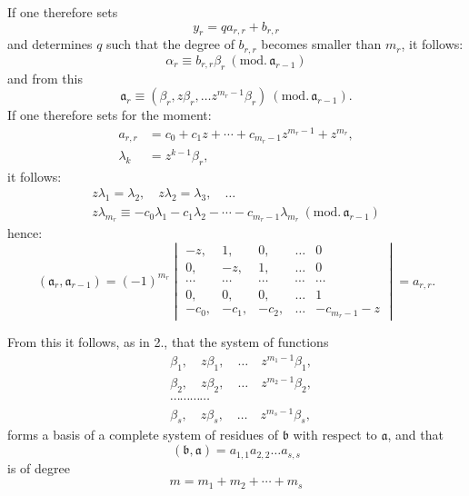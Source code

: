 \documentclass{article}
\begin{document}
If one therefore sets
\[ y_{r} = qa_{r,r} + b_{r,r} \]
and determines $q$ such that the degree of $b_{r,r}$ becomes smaller than $m_{r}$, it follows:
\[ \alpha_{r} \equiv b_{r,r}\beta_{r} \ (\text{mod.}\,\mathfrak{a}_{r-1}) \]
and from this
\[ \mathfrak{a}_{r} \equiv (\beta_{r}, z\beta_{r}, \ldots z^{m_{r}-1}\beta_{r}) \ (\text{mod.}\,\mathfrak{a}_{r-1}). \]
If one therefore sets for the moment:
\[ \begin{aligned} a_{r,r} &= c_{0} + c_{1}z + \cdots + c_{m_{r}-1}z^{m_{r}-1} + z^{m_{r}}, \\ \lambda_{k} &= z^{k-1}\beta_{r}, \end{aligned} \]
it follows:
\[ \begin{gathered} z\lambda_{1} = \lambda_{2}, \quad z\lambda_{2} = \lambda_{3}, \quad \ldots \\ z\lambda_{m_{r}} \equiv -c_{0}\lambda_{1} - c_{1}\lambda_{2} - \cdots - c_{m_{r}-1}\lambda_{m_{r}} \ (\text{mod.}\,\mathfrak{a}_{r-1}) \end{gathered} \]
hence:
\[ (\mathfrak{a}_{r}, \mathfrak{a}_{r-1}) = (-1)^{m_{r}} \begin{vmatrix} -z, & 1, & 0, & \ldots & 0 \\ 0, & -z, & 1, & \ldots & 0 \\ \cdots & \cdots & \cdots & \cdots & \cdots \\ 0, & 0, & 0, & \ldots & 1 \\ -c_{0}, & -c_{1}, & -c_{2}, & \ldots & -c_{m_{r}-1}-z \end{vmatrix} = a_{r,r}. \]

From this it follows, as in 2., that the system of functions
\[ \begin{aligned} &\beta_{1}, \quad z\beta_{1}, \quad \ldots \quad z^{m_{1}-1}\beta_{1}, \\ &\beta_{2}, \quad z\beta_{2}, \quad \ldots \quad z^{m_{2}-1}\beta_{2}, \\ &\cdots\cdots\cdots\cdots \\ &\beta_{s}, \quad z\beta_{s}, \quad \ldots \quad z^{m_{s}-1}\beta_{s}, \end{aligned} \]
forms a basis of a complete system of residues of $\mathfrak{b}$ with respect to $\mathfrak{a}$, and that
\[ (\mathfrak{b}, \mathfrak{a}) = a_{1,1}a_{2,2}\ldots a_{s,s} \]
is of degree
\[ m = m_{1} + m_{2} + \cdots + m_{s} \]
\end{document}
